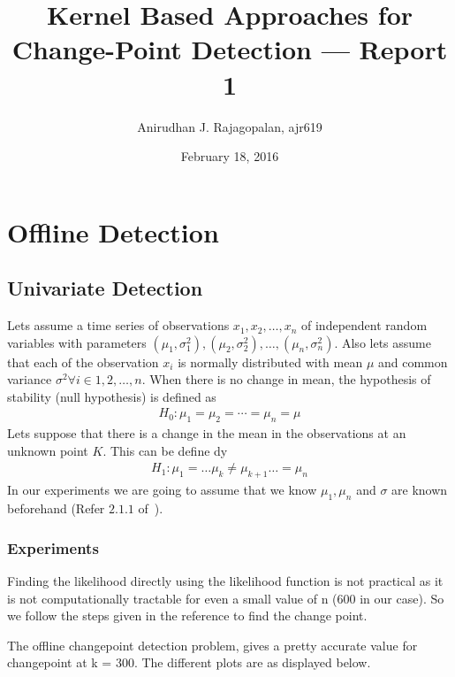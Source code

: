 \documentclass{article}
\begin{document}
\title{Kernel Based Approaches for Change-Point Detection --- Report 1}
\date{February 18, 2016}
\author{Anirudhan J. Rajagopalan, ajr619}

\maketitle

\newpage
\section{Offline Detection}
\subsection{Univariate Detection}
Lets assume a time series of observations $x_{1}, x_{2}, \ldots, x_{n} $ of independent random variables with parameters $(\mu_{1}, \sigma_{1}^{2}), (\mu_{2}, \sigma_{2}^{2}), \ldots, (\mu_{n}, \sigma_{n}^{2}) $.
Also lets assume that each of the observation $ x_{i} $ is normally distributed with mean $ \mu $ and common variance $\sigma^{2} \forall i \in 1, 2, \ldots ,n $.
When there is no change in mean, the hypothesis of stability (null hypothesis) is defined as
\begin{align}
  H_{0} : \mu_{1} = \mu_{2} = \cdots =  \mu_{n} = \mu
\end{align}
Lets suppose that there is a change in the mean in the observations at an unknown point $ K $.  This can be define dy
\begin{align}
  H_{1} : \mu_{1} = \ldots \mu_{k} \ne \mu_{k+1} \ldots =  \mu_{n}
\end{align}
In our experiments we are going to assume that we know $\mu_{1}, \mu_{n} $ and $ \sigma $ are known beforehand (Refer $2.1.1$ of~\cite{birkhauser_pscpa}).

\subsubsection{Experiments}
Finding the likelihood directly using the likelihood function is not practical as it is not computationally tractable for even a small value of n (600 in our case).  So we follow the steps given in the reference\cite{birkhauser_pscpa} to find the change point.

The offline changepoint detection problem, gives a pretty accurate value for changepoint at k = 300.  The different plots are as displayed below.
\end{document}
